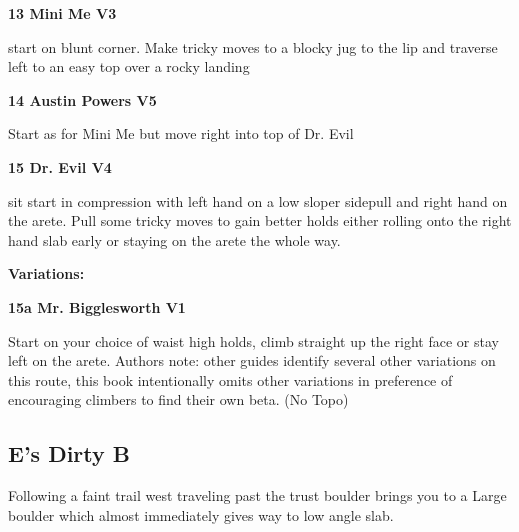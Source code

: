 \begin{multicols}{2}
					\label{rt:Mini Me}
\colorbox{green!20}{
\parbox{0.95\linewidth}{
\textbf{
13 Mini Me V3  
}
}
}

					\begin{adjustwidth}{0.5cm}{}				
					start on blunt corner. Make tricky moves to a blocky jug to the lip and traverse left to an easy top over a rocky landing
					\end{adjustwidth}
					\label{rt:Austin Powers}
\colorbox{RoyalBlue!20}{
\parbox{0.95\linewidth}{
\textbf{
14 Austin Powers V5  
}
}
}

					\begin{adjustwidth}{0.5cm}{}				
					Start as for Mini Me but move right into top of Dr. Evil
					\end{adjustwidth}

					\label{rt:Dr. Evil}
\colorbox{RoyalBlue!20}{
\parbox{0.95\linewidth}{
\textbf{
15 Dr. Evil V4  
}
}
}

					\begin{adjustwidth}{0.5cm}{}				
					sit start in compression with left hand on a low sloper sidepull and right hand on the arete. Pull some tricky moves to gain better holds either rolling onto the right hand slab early or staying on the arete the whole way.
					\end{adjustwidth}
						\begin{adjustwidth}{0.5cm}{}				
						\textbf{Variations:} \newline
							\label{vr:Mr. Bigglesworth}
\colorbox{green!20}{
\parbox{0.95\linewidth}{
\textbf{
15a Mr. Bigglesworth V1  
}
}
}

							\begin{adjustwidth}{0.5cm}{}				
							Start on your choice of waist high holds, climb straight up the right face or stay left on the arete. Authors note: other guides identify several other variations on this route, this book intentionally omits other variations in preference of encouraging climbers to find their own beta.
								\newline (No Topo) 
							\end{adjustwidth}
						\end{adjustwidth}
			\subsection*{E's Dirty B}\label{bf:E's Dirty B}
			Following a faint trail west traveling past the trust boulder brings you to a Large boulder which almost immediately gives way to low angle slab.\\
			

\end{multicols}
